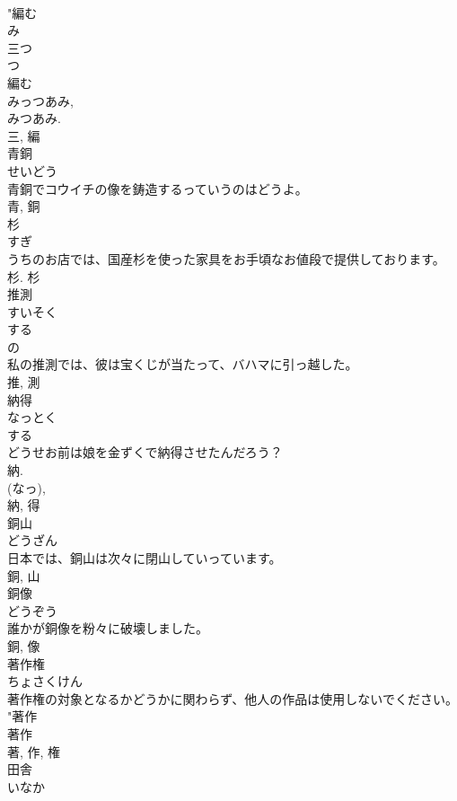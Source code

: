 \documentclass[8pt]{extreport}
\begin{document}
\begin{CJK}{UTF8}{min}
\\	"編む 
\\	み 
\\	三つ 
\\	つ 
\\	編む 
\\	みっつあみ, 
\\	みつあみ. 
\\	三, 編	
\\	青銅	
\\	せいどう	
\\	青銅でコウイチの像を鋳造するっていうのはどうよ。	
\\	青, 銅	
\\	杉	
\\	すぎ	
\\	うちのお店では、国産杉を使った家具をお手頃なお値段で提供しております。	
\\	杉.	杉	
\\	推測	
\\	すいそく	
\\	する 
\\	の 
\\	私の推測では、彼は宝くじが当たって、バハマに引っ越した。	
\\	推, 測	
\\	納得	
\\	なっとく	
\\	する 
\\	どうせお前は娘を金ずくで納得させたんだろう？	
\\	納. 
\\	(なっ), 
\\	納, 得	
\\	銅山	
\\	どうざん	
\\	日本では、銅山は次々に閉山していっています。	
\\	銅, 山	
\\	銅像	
\\	どうぞう	
\\	誰かが銅像を粉々に破壊しました。	
\\	銅, 像	
\\	著作権	
\\	ちょさくけん	
\\	著作権の対象となるかどうかに関わらず、他人の作品は使用しないでください。	
\\	"著作 
\\	著作 
\\	著, 作, 権	
\\	田舎	
\\	いなか	

\end{CJK}
\end{document}
